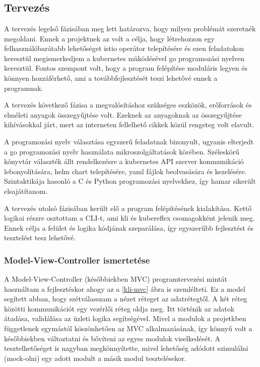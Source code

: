 \chapter{\kli}
\section{Tervezés}
A tervezés legelső fázisában meg lett határozva, hogy milyen problémát szeretnék megoldani.
Ennek a projektnek az volt a célja, hogy létrehozzon egy felhasználóbarátabb lehetőséget istio operátor telepítésére és ezen feladatokon keresztül megismerkedjem a kubernetes müködésével go programozási nyelven keresztül.
Fontos szempont volt, hogy a program felépítése moduláris legyen és könnyen hozzáférhető, ami a továbbfejlesztését teszi lehetővé ennek a programnak.

A tervezés következő fázisa a megvalósításhoz szükséges eszközök, erőforrások és elméleti anyagok összegyűjtése volt.
Ezeknek az anyagoknak az összegyűjtése kihívásokkal járt, mert az interneten fellelhető cikkek közül rengeteg volt elavult.

A programozási nyelv választása egyszerű feladatnak bizonyult, ugyanis elterjedt a go programozási nyelv használata mikroszolgáltatások körében.
Széleskörű könyvtár választék állt rendelkezésre a kubernetes API szerver kommunikáció lebonyolítására, helm chart telepítésére, yaml fájlok beolvasására és kezelésére.
Szintaktikája hasonló a C és Python programozási nyelvekhez, így hamar sikerült elsajátítanom.

A tervezés utolsó fázisában került elő a program felépítésének kialakítása.
Kettő logikai részre osztottam a CLI-t, ami kli és kubereflex csomagokként jelenik meg.
Ennek célja a felület és logika kódjának szeparálása, így egyszerűbb fejlesztést és tesztelést tesz lehetővé.

\subsection*{Model-View-Controller ismertetése}
A Model-View-Controller (későbbiekben MVC) programtervezési mintát használtam a fejlesztéskor ahogy az a \ref{kli-mvc} ábra is szemlélteti.
Ez a model segített abban, hogy szétválasszam a nézet réteget az adatrétegtől.
A két réteg közötti kommunikációt egy vezérlői réteg oldja meg.
Itt történik az adatok átadása, validálása az üzleti logika segítségével.
Mivel a modulok a projetkben függetlenek egymástól köszönhetően az MVC alkalmazásának, így könnyű volt a későbbiekben változtatni és bővíteni az egyes modulok viselkedését.
A tesztelhetőséget is nagyban megkönnyítette, mivel lehetőség adódott szimulálni (mock-olni) egy adott modult a másik modul tesztelésekor.

